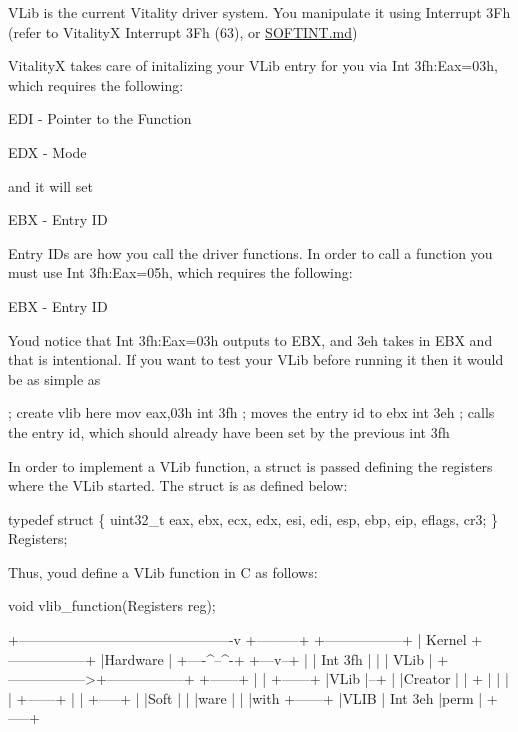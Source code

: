 V\+Lib is the current Vitality driver system. You manipulate it using Interrupt 3\+Fh (refer to VitalityX Interrupt 3\+Fh (63), or \hyperlink{a00008}{S\+O\+F\+T\+I\+N\+T.\+md})

VitalityX takes care of initalizing your V\+Lib entry for you via Int 3fh\+:Eax=03h, which requires the following\+:


\begin{DoxyItemize}
\item E\+DI -\/ Pointer to the Function
\item E\+DX -\/ Mode
\end{DoxyItemize}

and it will set


\begin{DoxyItemize}
\item E\+BX -\/ Entry ID
\end{DoxyItemize}

Entry ID\textquotesingle{}s are how you call the driver functions. In order to call a function you must use Int 3fh\+:Eax=05h, which requires the following\+:


\begin{DoxyItemize}
\item E\+BX -\/ Entry ID
\end{DoxyItemize}

You\textquotesingle{}d notice that Int 3fh\+:Eax=03h outputs to E\+BX, and 3eh takes in E\+BX and that is intentional. If you want to test your V\+Lib before running it then it would be as simple as 
\begin{DoxyCode}
; create vlib here
mov eax,03h
int 3fh ; moves the entry id to ebx
int 3eh ; calls the entry id, which should already have been set by the previous int 3fh
\end{DoxyCode}


In order to implement a V\+Lib function, a struct is passed defining the registers where the V\+Lib started. The struct is as defined below\+:


\begin{DoxyCode}
typedef struct \{
    uint32\_t eax, ebx, ecx, edx, esi, edi, esp, ebp, eip, eflags, cr3;
\} Registers;
\end{DoxyCode}


Thus, youd define a V\+Lib function in C as follows\+: 
\begin{DoxyCode}
void vlib\_function(Registers reg);
\end{DoxyCode}



\begin{DoxyCode}
             +----------------------------------------------v
     +---------+                                         +-----------------+
     |  Kernel +-----------------+                       |Hardware         |
     +----^--^-+             +---v--+                    |                 |
  Int 3fh |  |               | VLib | +----------------->+-----------------+
+------+  |  |               +------+
|VLib  |--+  |
|Creator     |
|      +     |
|      |     |
+------+     |
             |
+-----+      |
|Soft |      |
|ware |      |
|with +------+
|VLIB |  Int 3eh
|perm |
+-----+
\end{DoxyCode}
 